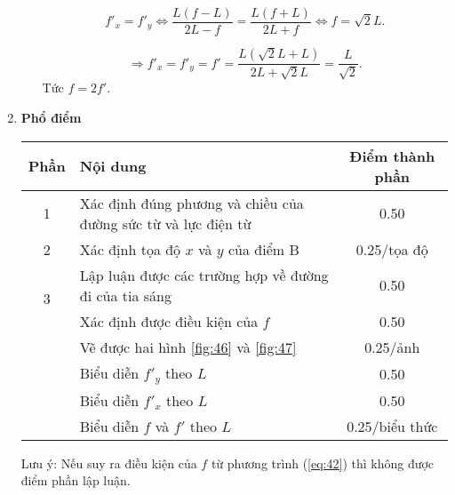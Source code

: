 \begin{enumerate}
\begin{enumerate}
    \begin{equation}
        f'_x = f'_y
        \iff \frac{L(f-L)}{2L-f} = \frac{L(f+L)}{2L+f}
        \iff f = \sqrt{2}L.
    \end{equation}

    \begin{equation}
        \Longrightarrow f'_x = f'_y = f' = \frac{L \left(\sqrt{2}L + L \right)}{2L + \sqrt{2}L} = \frac{L}{\sqrt{2}}.
    \end{equation}
    Tức $f = 2f'$.
    \end{enumerate}

    \item \textbf{Phổ điểm}
    
    \begin{center}
    \begin{tabular}{|c|p{8cm}|c|}
    \hline
    \multicolumn{1}{|l|}{Phần} & Nội dung & Điểm thành phần \\ 
    \hline
    1 & Xác định đúng phương và chiều của đường sức từ và lực điện từ & 0.50 \\
    \hline
    2 & Xác định tọa độ $x$ và $y$ của điểm B & 0.25/tọa độ \\
    \hline
    \multirow{2}{*}{3}         
    & Lập luận được các trường hợp về đường đi của tia sáng & 0.50 \\
    \cline{2-3} 
    & Xác định được điều kiện của $f$ & 0.50 \\
    \cline{2-3} 
    & Vẽ được hai hình \ref{fig:46} và \ref{fig:47} & 0.25/ảnh \\
    \cline{2-3}
    & Biểu diễn $f'_y$ theo $L$ & 0.50  \\
    \cline{2-3}
    & Biểu diễn $f'_x$ theo $L$ & 0.50  \\
    \cline{2-3}
    & Biểu diễn $f$ và $f'$ theo $L$  & 0.25/biểu thức \\
    \hline
    \end{tabular}
    \end{center}
    Lưu ý: Nếu suy ra điều kiện của $f$ từ phương trình (\ref{eq:42}) thì không được điểm phần lập luận. 
\end{enumerate}